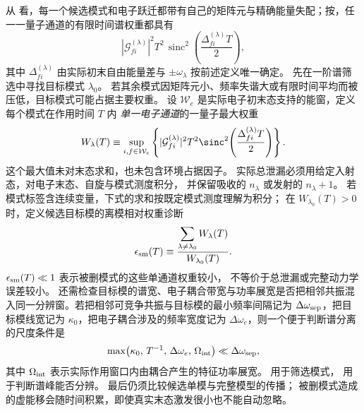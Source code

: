 从 看，每一个候选模式和电子跃迁都带有自己的矩阵元与精确能量失配；按，任一一量子通道的有限时间谱权重都具有
\begin{equation*}
\left|\mathcal G^{(\lambda)}_{fi}\right|^2
T^2\,\operatorname{sinc}^2\!\left(
\frac{\Delta^{(\lambda)}_{fi}T}{2}
\right),
\end{equation*}
其中 $\Delta^{(\lambda)}_{fi}$ 由实际初末自由能量差与 $\pm\omega_\lambda$ 按前述定义唯一确定。
先在一阶谱筛选中寻找目标模式 $\lambda_0$。
若其余模式因矩阵元小、频率失谐大或有限时间平均而被压低，目标模式可能占据主要权重。
设 $\mathcal W_e$ 是实际电子初末态支持的能窗，定义每个模式在作用时间 $T$ 内
\emph{单一电子通道}的一量子最大权重
\begin{equation*}
W_\lambda(T)
\equiv
\sup_{i,f\in\mathcal W_e}
\left\{
|\mathcal G_{fi}^{(\lambda)}|^2T^2
\sinc^2\!\left(\frac{\Delta_{fi}^{(\lambda)}T}{2}\right)
\right\}.
\end{equation*}
这个最大值未对末态求和，也未包含环境占据因子。
实际总泄漏必须用给定入射态，对电子末态、自旋与模式测度积分，
并保留吸收的 $n_\lambda$ 或发射的 $n_\lambda+1$。
若模式标签含连续变量，下式的求和按既定模式测度理解为积分；
在 $W_{\lambda_0}(T)>0$ 时，定义候选目标模的离模相对权重诊断
\begin{equation}
{
\epsilon_{\rm sm}(T)
\equiv
\frac{\displaystyle\sum_{\lambda\neq\lambda_0}W_\lambda(T)}
{W_{\lambda_0}(T)}.}
\label{eq:single_mode_finite_time_leakage}
\end{equation}
 $\epsilon_{\rm sm}(T)\ll1$ 表示被删模式的这些单通道权重较小，
不等价于总泄漏或完整动力学误差较小。
还需检查目标模的谱宽、电子耦合带宽与功率展宽是否把相邻共振混入同一分辨窗。若把相邻可竞争共振与目标模的最小频率间隔记为 $\Delta\omega_{\rm sep}$，把目标模线宽记为 $\kappa_0$，把电子耦合涉及的频率宽度记为 $\Delta\omega_e$，则一个便于判断谱分离的尺度条件是
\begin{equation}
{
\max\!\left(
\kappa_0,\,T^{-1},\,\Delta\omega_e,\,\Omega_{\rm int}
\right)
\ll\Delta\omega_{\rm sep},}
\label{eq:single_mode_spectral_isolation_condition}
\end{equation}
其中 $\Omega_{\rm int}$ 表示实际作用窗口内由耦合产生的特征功率展宽。 用于筛选模式，
 用于判断谱峰能否分辨。
最后仍须比较候选单模与完整模型的传播；
被删模式造成的虚能移会随时间积累，即使真实末态激发很小也不能自动忽略。

